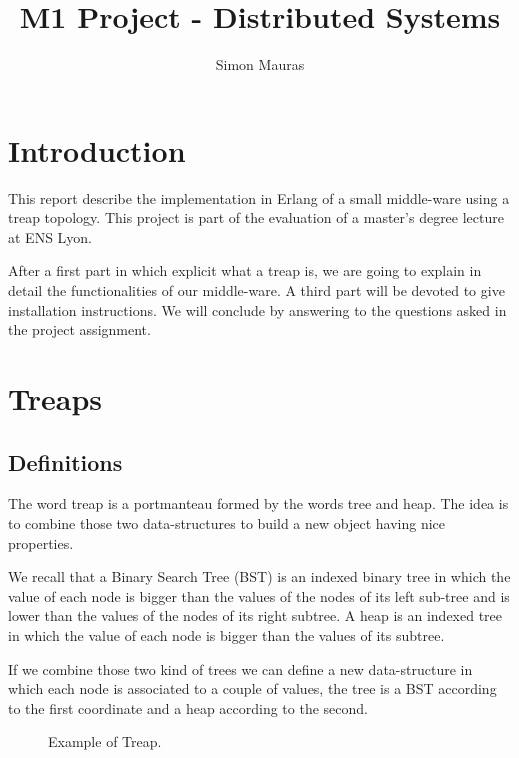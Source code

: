 \documentclass[a4paper, 11pt]{article}
\title{M1 Project - Distributed Systems}
\author{Simon Mauras}
\begin{document}
\maketitle

\tableofcontents


\section{Introduction}

This report describe the implementation in Erlang of a small middle-ware using a treap topology. This project is part of the evaluation of a master's degree lecture at ENS Lyon.

After a first part in which explicit what a treap is, we are going to explain in detail the functionalities of our middle-ware. A third part will be devoted to give installation instructions. We will conclude by answering to the questions asked in the project assignment.

\newpage



\section{Treaps}

\subsection{Definitions}

The word treap is a portmanteau formed by the words tree and heap. The idea is to combine those two data-structures to build a new object having nice properties.

\medskip We recall that a Binary Search Tree (BST) is an indexed binary tree in which the value of each node is bigger than the values of the nodes of its left sub-tree and is lower than the values of the nodes of its right subtree. A heap is an indexed tree in which the value of each node is bigger than the values of its subtree.

\medskip If we combine those two kind of trees we can define a new data-structure in which each node is associated to a couple of values, the tree is a BST according to the first coordinate and a heap according to the second.

\begin{figure}[h!]
  \centering
  \caption{Example of Treap.}
\end{figure}
\end{document}

